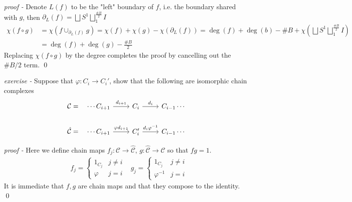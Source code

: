 \documentclass[11pt]{article}
\theoremstyle{definition}
\begin{document}
    \emph{proof - } Denote \(L(f)\) to be the "left" boundary of \(f\), i.e. the boundary shared with \(g\), then \(\partial_L(f) = \bigsqcup S^1 \bigsqcup_{1}^{\frac{\#B}{2}}I\)
    \begin{align*}
        \chi(f\circ g) &= \chi(f \cup_{\partial_L(f)} g) = \chi(f) + \chi(g) - \chi(\partial_L(f)) = \deg(f) + \deg(b) - \#B + \chi(\bigsqcup S^1 \bigsqcup_{1}^{\frac{\#B}{2}}I) \\ &= \deg(f) + \deg(g) - \frac{\# B}{2}
    \end{align*}
    Replacing \(\chi(f\circ g)\) by the degree completes the proof by cancelling out the \(\#B/2\) term. \qed



    \emph{exercise - } Suppose that \(\varphi: C_i \to C_i'\), show that the following are isomorphic chain complexes
    \begin{equation*}
        \begin{tikzcd}
            \mathcal{C} = \quad \cdots C_{i+1} \arrow[r,"{d_{i+1}}"] &C_i \arrow[r,"{d_i}"] &C_{i-1}\cdots  \\
            \hat{\mathcal{C}} = \quad \cdots C_{i+1} \arrow[r,"{\varphi d_{i+1}}"] &C_i' \arrow[r,"{d_i \varphi^{-1}}"] &C_{i-1}\cdots
        \end{tikzcd}
    \end{equation*}

    \emph{proof - } Here we define chain maps \(f_j: \mathcal{C} \to \hat{\mathcal{C}}\), \(g: \hat{\mathcal{C}} \to \mathcal{C}\) so that \(fg = 1\).
    \begin{align*}
        &f_j = \begin{cases}
            1_{C_j} & j \neq i \\
            \varphi & j = i
        \end{cases} &g_j = \begin{cases}
            1_{C_j} & j\neq i\\
            \varphi^{-1} &j=i
        \end{cases}
    \end{align*}
    It is immediate that \(f,g\) are chain maps and that they compose to the identity. \qed


\end{document}
